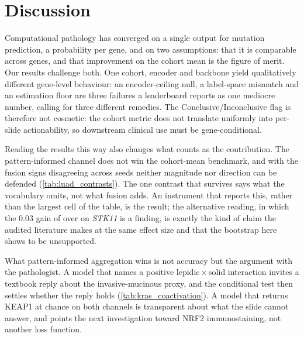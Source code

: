 
\section*{Discussion}

Computational pathology has converged on a single output for mutation
prediction, a probability per gene, and on two assumptions: that it is
comparable across genes, and that improvement on the
cohort mean is the figure of merit. Our results challenge both. One
cohort, encoder and backbone yield qualitatively different gene-level
behaviour: an encoder-ceiling null, a label-space mismatch and an
estimation floor are three failures a leaderboard reports as one
mediocre number, calling for three different remedies. The
Conclusive/Inconclusive flag is therefore not cosmetic: the cohort
metric does not translate uniformly into per-slide actionability, so
downstream clinical use must be gene-conditional.

Reading the results this way also changes what counts as the
contribution. The pattern-informed channel does not win the cohort-mean
benchmark, and with the fusion signs disagreeing across seeds neither
magnitude nor direction can be defended (\cref{tab:luad_contrasts}). The
one contrast that survives says what the vocabulary omits, not what
fusion adds. An instrument that reports this, rather than the largest
cell of the table, is the result; the alternative reading, in which
the $0.03$ gain of \fcmil{} over \piabmil{} on \textit{STK11} is a
finding, is exactly the kind of claim the audited literature makes at
the same effect size and that the bootstrap here shows to be
unsupported.

What pattern-informed aggregation wins is not accuracy but the argument
with the pathologist. A model that names a positive
lepidic\,$\times$\,solid interaction invites a textbook reply about the
invasive-mucinous proxy, and the conditional test then settles whether
the reply holds (\cref{tab:kras_coactivation}). A model that returns
KEAP1 at chance on both channels is transparent about what the slide
cannot answer, and points the next investigation toward NRF2
immunostaining, not another loss function.\cite{rudin2019stop}


